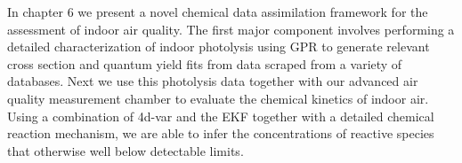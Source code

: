 In chapter 6 we present a novel chemical data assimilation framework for the assessment of indoor air quality. The first major component involves performing a detailed characterization of indoor photolysis using GPR to generate relevant cross section and quantum yield fits from data scraped from a variety of databases. Next we use this photolysis data together with our advanced air quality measurement chamber to evaluate the chemical kinetics of indoor air. Using a combination of 4d-var and the EKF together with a detailed chemical reaction mechanism, we are able to infer the concentrations of reactive species that otherwise well below detectable limits.



